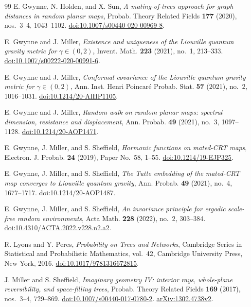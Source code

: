 \begin{thebibliography}{99}
E. Gwynne, N. Holden, and X. Sun,
\emph{A mating-of-trees approach for graph distances in random planar maps},
Probab. Theory Related Fields \textbf{177} (2020), nos.~3--4, 1043--1102.
\href{https://doi.org/10.1007/s00440-020-00969-8}{doi:10.1007/s00440-020-00969-8}.

E. Gwynne and J. Miller,
\emph{Existence and uniqueness of the Liouville quantum gravity metric
for $\gamma\in(0,2)$},
Invent. Math. \textbf{223} (2021), no.~1, 213--333.
\href{https://doi.org/10.1007/s00222-020-00991-6}{doi:10.1007/s00222-020-00991-6}.

E. Gwynne and J. Miller,
\emph{Conformal covariance of the Liouville quantum gravity metric
for $\gamma\in(0,2)$},
Ann. Inst. Henri Poincar\'e Probab. Stat. \textbf{57} (2021), no.~2,
1016--1031.
\href{https://doi.org/10.1214/20-AIHP1105}{doi:10.1214/20-AIHP1105}.

E. Gwynne and J. Miller,
\emph{Random walk on random planar maps: spectral dimension, resistance
and displacement},
Ann. Probab. \textbf{49} (2021), no.~3, 1097--1128.
\href{https://doi.org/10.1214/20-AOP1471}{doi:10.1214/20-AOP1471}.

E. Gwynne, J. Miller, and S. Sheffield,
\emph{Harmonic functions on mated-CRT maps},
Electron. J. Probab. \textbf{24} (2019), Paper No.~58, 1--55.
\href{https://doi.org/10.1214/19-EJP325}{doi:10.1214/19-EJP325}.

E. Gwynne, J. Miller, and S. Sheffield,
\emph{The Tutte embedding of the mated-CRT map converges to Liouville
quantum gravity},
Ann. Probab. \textbf{49} (2021), no.~4, 1677--1717.
\href{https://doi.org/10.1214/20-AOP1487}{doi:10.1214/20-AOP1487}.

E. Gwynne, J. Miller, and S. Sheffield,
\emph{An invariance principle for ergodic scale-free random environments},
Acta Math. \textbf{228} (2022), no.~2, 303--384.
\href{https://doi.org/10.4310/ACTA.2022.v228.n2.a2}{doi:10.4310/ACTA.2022.v228.n2.a2}.

R. Lyons and Y. Peres,
\emph{Probability on Trees and Networks},
Cambridge Series in Statistical and Probabilistic Mathematics, vol.~42,
Cambridge University Press, New York, 2016.
\href{https://doi.org/10.1017/9781316672815}{doi:10.1017/9781316672815}.

J. Miller and S. Sheffield,
\emph{Imaginary geometry IV: interior rays, whole-plane reversibility,
and space-filling trees},
Probab. Theory Related Fields \textbf{169} (2017), nos.~3--4, 729--869.
\href{https://doi.org/10.1007/s00440-017-0780-2}{doi:10.1007/s00440-017-0780-2}.
\href{https://arxiv.org/abs/1302.4738v2}{arXiv:1302.4738v2}.


\end{thebibliography}
